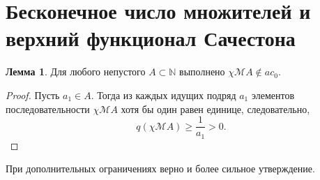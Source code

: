\documentclass[a4paper,openbib]{article}
\renewcommand{\geq}{\geqslant} %
\theoremstyle{definition}
\newtheorem{lemma}{Лемма}[section]
\begin{document}


\section{Бесконечное число множителей и \\  верхний функционал Сачестона}




\begin{lemma}
	Для любого непустого $A\subset \mathbb{N} $ выполнено $\chi\mathscr{M}A \notin ac_0$.
\end{lemma}
\begin{proof}
	Пусть $a_1\in A$.
	Тогда из каждых идущих подряд $a_1$ элементов последовательности $\chi\mathscr{M}A$
	хотя бы один равен единице,
	следовательно,
	\begin{equation}
		q(\chi\mathscr{M}A) \geq \frac{1}{a_1} > 0
		.
	\end{equation}
\end{proof}

При дополнительных ограничениях верно и более сильное утверждение.
\end{document}
